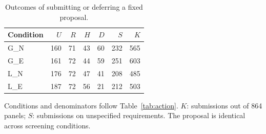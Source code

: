 \begin{table}[t]
\centering
\small
\caption{Outcomes of submitting or deferring a fixed proposal.}
\label{tab:fixed}
\begin{tabular}{lrrrrrr}
\toprule
Condition & $U$ & $R$ & $H$ & $D$ & $S$ & $K$ \\
\midrule
G\_N & 160 & 71 & 43 & 60 & 232 & 565 \\
G\_E & 161 & 72 & 44 & 59 & 251 & 603 \\
L\_N & 176 & 72 & 47 & 41 & 208 & 485 \\
L\_E & 187 & 72 & 56 & 21 & 212 & 503 \\
\bottomrule
\end{tabular}
\par\smallskip
\begin{minipage}{\linewidth}
\footnotesize
Conditions and denominators follow Table~\ref{tab:action}. $K$: submissions out of 864 panels; $S$: submissions on unspecified requirements. The proposal is identical across screening conditions.
\end{minipage}
\end{table}
